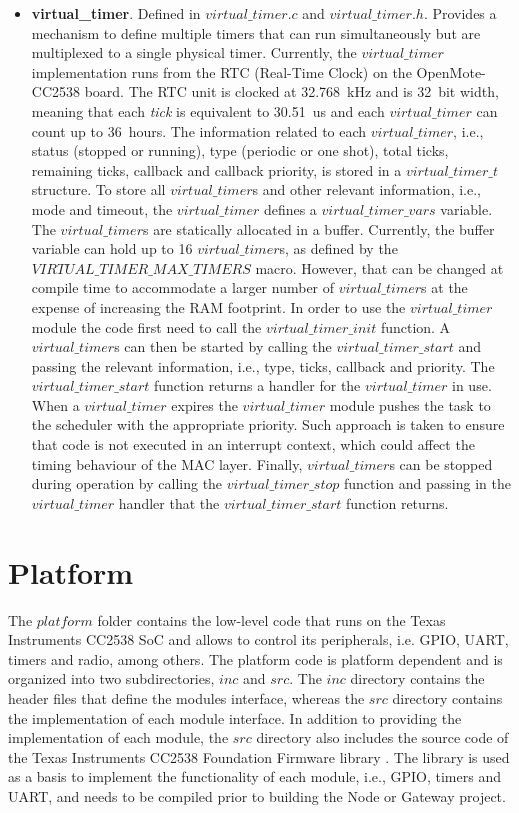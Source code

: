 \begin{itemize}
\item \textbf{virtual\_timer}. Defined in $virtual\_timer.c$ and $virtual\_timer.h$. Provides a mechanism to define multiple timers that can run simultaneously but are multiplexed to a single physical timer. Currently, the $virtual\_timer$ implementation runs from the RTC (Real-Time Clock) on the OpenMote-CC2538 board. The RTC unit is clocked at 32.768~kHz and is 32~bit width, meaning that each \textit{tick} is equivalent to 30.51~us and each $virtual\_timer$ can count up to 36~hours. The information related to each $virtual\_timer$, i.e., status (stopped or running), type (periodic or one shot), total ticks, remaining ticks, callback and callback priority, is stored in a $virtual\_timer\_t$ structure. To store all $virtual\_timer$s and other relevant information, i.e., mode and timeout, the $virtual\_timer$ defines a $virtual\_timer\_vars$ variable. The $virtual\_timer$s are statically allocated in a buffer. Currently, the buffer variable can hold up to 16 $virtual\_timer$s, as defined by the $VIRTUAL\_TIMER\_MAX\_TIMERS$ macro. However, that can be changed at compile time to accommodate a larger number of $virtual\_timer$s at the expense of increasing the RAM footprint. In order to use the $virtual\_timer$ module the code first need to call the $virtual\_timer\_init$ function. A $virtual\_timer$s can then be started by calling the $virtual\_timer\_start$ and passing the relevant information, i.e., type, ticks, callback and priority. The $virtual\_timer\_start$ function returns a handler for the $virtual\_timer$ in use. When a $virtual\_timer$ expires the $virtual\_timer$ module pushes the task to the scheduler with the appropriate priority. Such approach is taken to ensure that code is not executed in an interrupt context, which could affect the timing behaviour of the MAC layer. Finally, $virtual\_timer$s can be stopped during operation by calling the $virtual\_timer\_stop$ function and passing in the $virtual\_timer$ handler that the $virtual\_timer\_start$ function returns.
\end{itemize}

\section{Platform}
The $platform$ folder contains the low-level code that runs on the Texas Instruments CC2538 SoC and allows to control its peripherals, i.e. GPIO, UART, timers and radio, among others. The platform code is platform dependent and is organized into two subdirectories, $inc$ and $src$. The $inc$ directory contains the header files that define the modules interface, whereas the $src$ directory contains the implementation of each module interface. In addition to providing the implementation of each module, the $src$ directory also includes the source code of the Texas Instruments CC2538 Foundation Firmware library \cite{cc2538ff}. The library is used as a basis to implement the functionality of each module, i.e., GPIO, timers and UART, and needs to be compiled prior to building the Node or Gateway project.

